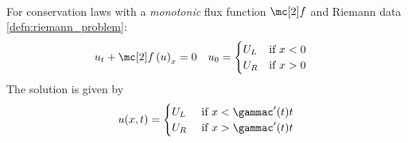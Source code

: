 \begin{defnbox}\nospacing
    \begin{defn}\label{defn:shock_wave_solution}\leavevmode\\
        For conservation laws with a \textit{monotonic} flux function $\flux$ and Riemann data \cref{defn:riemann_problem}:
        \begin{align*}
        &u_{t}+\flux \left(u\right)_{x}=0
        &&u_{0}=\begin{cases}
                U_{L}&\text{if }x<0\\
                U_{R}&\text{if }x>0
                \end{cases}
        \end{align*}
        The solution is given by
        \begin{align}
          u(x,t)=
          \begin{cases}
              U_{L}&\text{ if }x<\gammac'(t)t\\
              U_{R}&\text{ if }x>\gammac'(t)t
          \end{cases}
        \end{align}
    \end{defn}
\end{defnbox}
